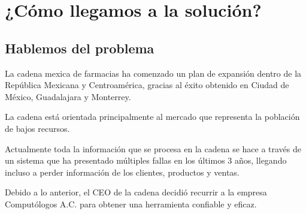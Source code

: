 \documentclass[12pt, fleqn]{report}                             %
\newcommand \Quote              {\qq}                           %
\theoremstyle{break}                                            %
\begin{document}
\tableofcontents{}
\label{sec:Index}

\clearpage



\part{¿Cómo llegamos a la solución?}

    \chapter{Hablemos del problema}

        La cadena mexica de farmacias \Quote{Doctor Ahorro} ha comenzado un plan de expansión dentro de la República Mexicana
        y Centroamérica, gracias al éxito obtenido en Ciudad de México, Guadalajara y Monterrey. 
        
        La cadena está orientada principalmente al mercado que representa la población de bajos recursos. 
        
        Actualmente toda la información que se procesa en la cadena se hace a través de un sistema que ha presentado 
        múltiples fallas en los últimos 3 años, llegando incluso a perder información de los clientes, productos y ventas. 
        
        Debido a lo anterior, el CEO de la cadena decidió recurrir a la empresa Computólogos A.C. para obtener una herramienta 
        confiable y eficaz. 


\end{document}
